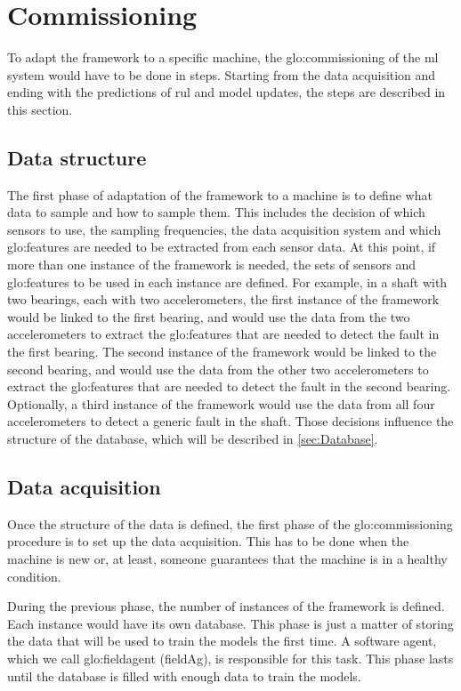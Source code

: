 \section{Commissioning}
\label{sec:commissioning}
To adapt the framework to a specific machine, the \gls{glo:commissioning} of the \gls{ml} system would have to be done in steps. Starting from the data acquisition and ending with the predictions of \gls{rul} and model updates, the steps are described in this section.

\subsection{Data structure}
\label{sec:Data_structure}
The first phase of adaptation of the framework to a machine is to define what data to sample and how to sample them. This includes the decision of which sensors to use, the sampling frequencies, the data acquisition system and which \gls{glo:feature}s are needed to be extracted from each sensor data. At this point, if more than one instance of the framework is needed, the sets of sensors and \gls{glo:feature}s to be used in each instance are defined. For example, in a shaft with two bearings, each with two accelerometers, the first instance of the framework would be linked to the first bearing, and would use the data from the two accelerometers to extract the \gls{glo:feature}s that are needed to detect the fault in the first bearing. The second instance of the framework would be linked to the second bearing, and would use the data from the other two accelerometers to extract the \gls{glo:feature}s that are needed to detect the fault in the second bearing. Optionally, a third instance of the framework would use the data from all four accelerometers to detect a generic fault in the shaft.
Those decisions influence the structure of the database, which will be described in \autoref{sec:Database}. 

\subsection{Data acquisition}
Once the structure of the data is defined, the first phase of the \gls{glo:commissioning} procedure is to set up the data acquisition. This has to be done when the machine is new or, at least, someone guarantees that the machine is in a healthy condition.

During the previous phase, the number of instances of the framework is defined. Each instance would have its own database. This phase is just a matter of storing the data that will be used to train the models the first time. A software agent, which we call \gls{glo:fieldagent} (\gls{fieldAg}), is responsible for this task. 
This phase lasts until the database is filled with enough data to train the models.

